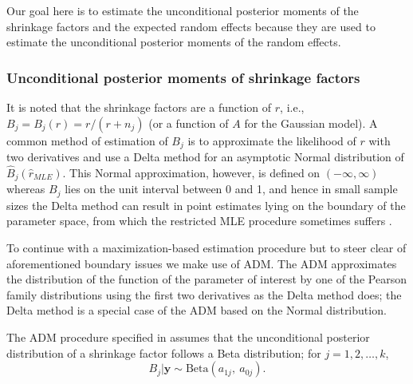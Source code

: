 \documentclass[article]{jss}
\begin{document}
Our goal here is to estimate the unconditional posterior moments of the shrinkage factors and the expected random effects because they are used to estimate the unconditional posterior moments of the random effects. 

\subsubsection{Unconditional posterior moments of shrinkage factors}  It is noted that  the shrinkage factors  are a function of $r$, i.e., $B_{j}= B_{j}(r)=r/(r+n_{j})$ (or a function of $A$ for the Gaussian model). A common method of estimation of $B_{j}$ is to approximate the likelihood of $r$ with two derivatives and use  a Delta method for an asymptotic Normal distribution of $\hat{B}_{j}(\hat{r}_{MLE})$. This Normal approximation, however, is defined on $(-\infty, \infty)$ whereas $B_{j}$ lies on the unit interval between 0 and 1, and hence in small sample sizes the Delta method can result in point estimates lying on the boundary of the parameter space, from which the restricted MLE procedure sometimes suffers \citep{tang2011, kelly2014advances}.

To continue with a maximization-based estimation procedure but to steer clear of aforementioned boundary issues we make use of  ADM. The ADM approximates the distribution of the function of the parameter of interest by one of the Pearson family distributions using the first two derivatives as the Delta method does; the Delta method is a special case of the ADM based on the Normal distribution. 


The ADM procedure specified in \cite{tang2011} assumes that the unconditional posterior distribution of a shrinkage factor follows a Beta distribution; for $j=1, 2, \ldots, k$,
\begin{equation}\label{admshrinkage}
B_j\vert\boldsymbol{y}\sim \textrm{Beta}(a_{1j},~ a_{0j}).
\end{equation}
\end{document}
